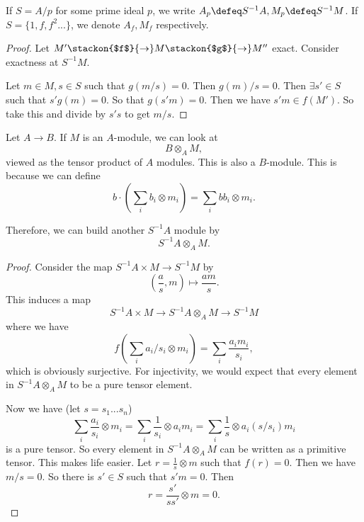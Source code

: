 \begin{notation}
    If $S=A/p$ for some prime ideal $p$, we write $A_p\defeq S^{-1}A, M_p\defeq S^{-1}M$. If $S=\{1,f,f^2...\}$, we denote $A_f,M_f$ respectively.
\end{notation}
\begin{proof}
    Let $M'\stackon{$f$}{\to} M\stackon{$g$}{\to} M''$ exact. Consider exactness at $S^{-1}M$.

    Let $m\in M, s\in S$ such that $g(m/s)=0$. Then $g(m)/s=0$. Then $\exists s'\in S$ such that $s'g(m)=0$. So that $g(s'm)=0$. Then we have $s'm\in f(M')$. So take this and divide by $s's$ to get $m/s$. 



\end{proof}
Let $A\to B$. If $M$ is an $A$-module, we can look at \[
B \otimes_{A} M,
\]
viewed as the tensor product of $A$ modules. This is also a $B$-module. This is because we can define \[
b \cdot (\sum_i b_i\otimes m_i) = \sum_i bb_i\otimes m_i.
\]

Therefore, we can build another $S^{-1}A$ module by \[
S^{-1}A \otimes_A M.
\]
\begin{proof}
    Consider the map $S^{-1}A\times M\to S^{-1}M$ by \[
    (\frac{a}{s},m)\mapsto \frac{am}{s}.
    \]
    This induces a map \[
        S^{-1}A\times M\to S^{-1}A\otimes_A M \to S^{-1}M
    \]
    where we have \[
    f(\sum_i a_i/s_i \otimes m_i)=\sum_{i}\frac{a_im_i}{s_i},
    \]
    which is obviously surjective.
    For injectivity, we would expect that every element in $S^{-1}A\otimes_A M$ to be a pure tensor element.

    Now we have (let $s=s_1...s_n$)\[
    \sum_i \frac{a_i}{s_i}\otimes m_i = \sum_{i}\frac{1}{s_i}\otimes{a_im_i} = \sum_{i}\frac{1}{s}\otimes {a_i(s/s_i) m_i}
    \]
    is a pure tensor. 
    So every element in $S^{-1}A\otimes_A M$ can be written as a primitive tensor. 
    This makes life easier. Let $r=\frac{1}{s}\otimes m$ such that $f(r)=0$. 
    Then we have $m/s=0$. So there is $s'\in S$ such that $s'm=0$. Then \[
    r=\frac{s'}{ss'}\otimes m =0.
    \]
\end{proof}

